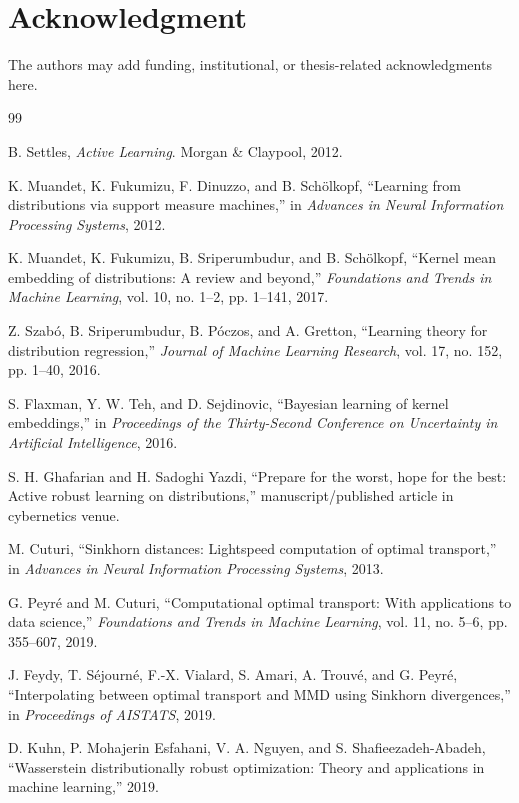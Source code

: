 \documentclass[11pt,a4paper]{article}
\begin{document}
\section*{Acknowledgment}
The authors may add funding, institutional, or thesis-related acknowledgments here.

\begin{thebibliography}{99}

B. Settles, \emph{Active Learning}. Morgan \& Claypool, 2012.

K. Muandet, K. Fukumizu, F. Dinuzzo, and B. Schölkopf, ``Learning from distributions via support measure machines,'' in \emph{Advances in Neural Information Processing Systems}, 2012.

K. Muandet, K. Fukumizu, B. Sriperumbudur, and B. Schölkopf, ``Kernel mean embedding of distributions: A review and beyond,'' \emph{Foundations and Trends in Machine Learning}, vol. 10, no. 1--2, pp. 1--141, 2017.

Z. Szabó, B. Sriperumbudur, B. Póczos, and A. Gretton, ``Learning theory for distribution regression,'' \emph{Journal of Machine Learning Research}, vol. 17, no. 152, pp. 1--40, 2016.

S. Flaxman, Y. W. Teh, and D. Sejdinovic, ``Bayesian learning of kernel embeddings,'' in \emph{Proceedings of the Thirty-Second Conference on Uncertainty in Artificial Intelligence}, 2016.

S. H. Ghafarian and H. Sadoghi Yazdi, ``Prepare for the worst, hope for the best: Active robust learning on distributions,'' manuscript/published article in cybernetics venue.

M. Cuturi, ``Sinkhorn distances: Lightspeed computation of optimal transport,'' in \emph{Advances in Neural Information Processing Systems}, 2013.

G. Peyré and M. Cuturi, ``Computational optimal transport: With applications to data science,'' \emph{Foundations and Trends in Machine Learning}, vol. 11, no. 5--6, pp. 355--607, 2019.

J. Feydy, T. Séjourné, F.-X. Vialard, S. Amari, A. Trouvé, and G. Peyré, ``Interpolating between optimal transport and MMD using Sinkhorn divergences,'' in \emph{Proceedings of AISTATS}, 2019.

D. Kuhn, P. Mohajerin Esfahani, V. A. Nguyen, and S. Shafieezadeh-Abadeh, ``Wasserstein distributionally robust optimization: Theory and applications in machine learning,'' 2019.


\end{thebibliography}
\end{document}

